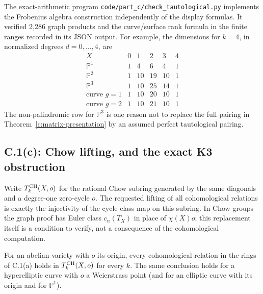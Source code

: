 The exact-arithmetic program \texttt{code/part\_c/check\_tautological.py} implements the Frobenius algebra construction independently of the display formulas. It verified 2,286 graph products and the curve/surface rank formula in the finite ranges recorded in its JSON output. For example, the dimensions for $k=4$, in normalized degrees $d=0,\ldots,4$, are
\[
\begin{array}{c|ccccc}
 X&0&1&2&3&4\\\hline
 \mathbb P^1&1&4&6&4&1\\
 \mathbb P^2&1&10&19&10&1\\
 \mathbb P^3&1&10&25&14&1\\
 \text{curve }g=1&1&10&20&10&1\\
 \text{curve }g=2&1&10&21&10&1
\end{array}
\]
The non-palindromic row for $\mathbb P^3$ is one reason not to replace the full pairing in Theorem~\ref{c:matrix-presentation} by an assumed perfect tautological pairing.

\subsection{C.1(c): Chow lifting, and the exact K3 obstruction}

Write $T_k^{\operatorname{CH}}(X,o)$ for the rational Chow subring generated by the same diagonals and a degree-one zero-cycle $o$. The requested lifting of all cohomological relations is exactly the injectivity of the cycle class map on this subring. In Chow groups the graph proof has Euler class $c_n(T_X)$ in place of $\chi(X)o$; this replacement itself is a condition to verify, not a consequence of the cohomological computation.

\begin{theorem}
\label{c:chow-positive}
For an abelian variety with $o$ its origin, every cohomological relation in the rings of C.1(a) holds in $T_k^{\operatorname{CH}}(X,o)$ for every $k$. The same conclusion holds for a hyperelliptic curve with $o$ a Weierstrass point (and for an elliptic curve with its origin and for $\mathbb P^1$).
\end{theorem}

